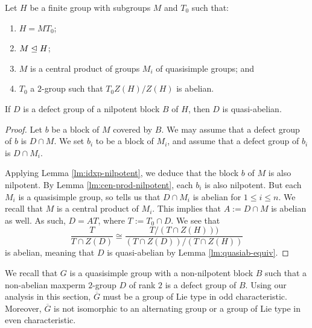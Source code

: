 \documentclass[bysection, amsart]{standard}
\begin{document}
\begin{lemma} \label{lm:smaller-nilpotent}
    Let $H$ be a finite group with subgroups $M$ and $T_0$ such that:
    \begin{enumerate}
        \item $H = MT_0$;
        \item $M \trianglelefteq H$;
        \item $M$ is a central product of groups $M_i$ of quasisimple groups; and
        \item $T_0$ a $2$-group such that $T_0 Z(H)/Z(H)$ is abelian.
    \end{enumerate}
    If $D$ is a defect group of a nilpotent block $B$ of $H$, then $D$ is quasi-abelian.
\end{lemma}
\begin{proof}
    Let $b$ be a block of $M$ covered by $B$. We may assume that a defect group of $b$ is $D \cap M$. We set $b_i$ to be a block of $M_i$, and assume that a defect group of $b_i$ is $D \cap M_i$.
    
    Applying Lemma \ref{lm:idxp-nilpotent}, we deduce that the block $b$ of $M$ is also nilpotent. By Lemma \ref{lm:cen-prod-nilpotent}, each $b_i$ is also nilpotent. But each $M_i$ is a quasisimple group, so \cite{paper:nilpotent-abelian-2} tells us that $D \cap M_i$ is abelian for $1 \leq i \leq n$. We recall that $M$ is a central product of $M_i$. This implies that $A := D \cap M$ is abelian as well. As such, $D = AT$, where $T := T_0 \cap D$. We see that 
    \[\frac{T}{T \cap Z(D)} \cong \frac{T/(T \cap Z(H)))}{(T \cap Z(D))/(T \cap Z(H))}\] 
    is abelian, meaning that $D$ is quasi-abelian by Lemma \ref{lm:quasiab-equiv}.
\end{proof}

We recall that $G$ is a quasisimple group with a non-nilpotent block $B$ such that a non-abelian maxperm $2$-group $D$ of rank $2$ is a defect group of $B$. Using our analysis in this section, $\overline{G}$ must be a group of Lie type in odd characteristic. Moreover, $\overline{G}$ is not isomorphic to an alternating group or a group of Lie type in even characteristic. 
\end{document}
